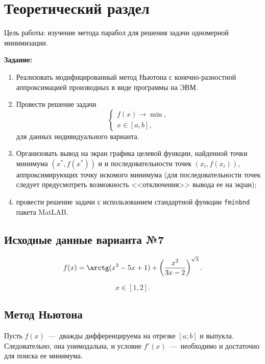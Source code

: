 \chapter{Теоретический раздел}

Цель работы: изучение метода парабол для решения задачи одномерной минимизации.

\textbf{Задание:}
\begin{enumerate}
	\item Реализовать модифицированный метод Ньютона с конечно-разностной аппроксимацией производных в виде программы на ЭВМ.
	\item Провести решение задачи 
	\begin{equation*}
		\begin{cases}
			f(x) \rightarrow \min, \\
			x \in [a, b],
		\end{cases}
	\end{equation*}
	для данных индивидуального варианта.
	\item Организовать вывод на экран графика целевой функции, найденной точки минимума $(x^{*}, f(x^{*}))$ и и последовательности точек $(x_i, f (x_i))$, аппроксимирующих точку искомого минимума (для последовательности точек следует предусмотреть возможность <<отключения>> вывода ее на экран);
	\item провести решение задачи с использованием стандартной функции \texttt{fminbnd} пакета MatLAB.
\end{enumerate}

\section{Исходные данные варианта №7}

\begin{equation*}
	f(x) = \arctg(x^3 - 5x + 1) + \left( \frac{x^2}{3x - 2} \right)^{\sqrt{3}}.
\end{equation*}

\begin{equation*}
	x \in [1, 2].
\end{equation*}

\section{Метод Ньютона}

Пусть $f(x)$~---~дважды дифференцируема на отрезке $[a;b]$ и выпукла. Следовательно, она унимодальна, и условие $f'(x)$~---~необходимо и достаточно для поиска ее минимума.

